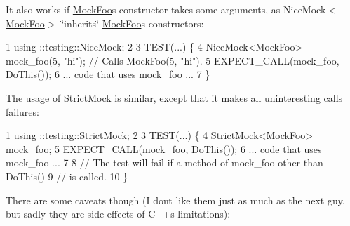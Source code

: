 It also works if {\ttfamily \hyperlink{class_mock_foo}{Mock\+Foo}}\textquotesingle{}s constructor takes some arguments, as {\ttfamily Nice\+Mock$<$\hyperlink{class_mock_foo}{Mock\+Foo}$>$} \char`\"{}inherits\char`\"{} {\ttfamily \hyperlink{class_mock_foo}{Mock\+Foo}}\textquotesingle{}s constructors\+:


\begin{DoxyCode}
1 using ::testing::NiceMock;
2 
3 TEST(...) \{
4   NiceMock<MockFoo> mock\_foo(5, "hi");  // Calls MockFoo(5, "hi").
5   EXPECT\_CALL(mock\_foo, DoThis());
6   ... code that uses mock\_foo ...
7 \}
\end{DoxyCode}


The usage of {\ttfamily Strict\+Mock} is similar, except that it makes all uninteresting calls failures\+:


\begin{DoxyCode}
1 using ::testing::StrictMock;
2 
3 TEST(...) \{
4   StrictMock<MockFoo> mock\_foo;
5   EXPECT\_CALL(mock\_foo, DoThis());
6   ... code that uses mock\_foo ...
7 
8   // The test will fail if a method of mock\_foo other than DoThis()
9   // is called.
10 \}
\end{DoxyCode}


There are some caveats though (I don\textquotesingle{}t like them just as much as the next guy, but sadly they are side effects of C++\textquotesingle{}s limitations)\+:


